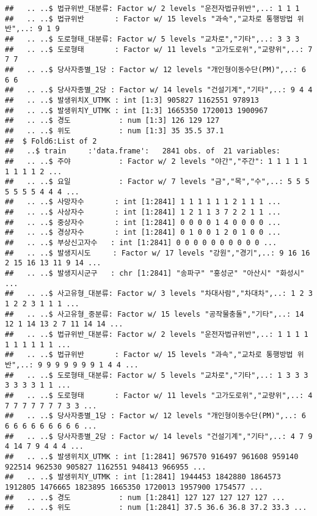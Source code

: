 \documentclass[]{article}
\begin{document}
\begin{verbatim}
##   .. ..$ 법규위반_대분류: Factor w/ 2 levels "운전자법규위반",..: 1 1 1
##   .. ..$ 법규위반       : Factor w/ 15 levels "과속","교차로 통행방법 위반",..: 9 1 9
##   .. ..$ 도로형태_대분류: Factor w/ 5 levels "교차로","기타",..: 3 3 3
##   .. ..$ 도로형태       : Factor w/ 11 levels "고가도로위","교량위",..: 7 7 7
##   .. ..$ 당사자종별_1당 : Factor w/ 12 levels "개인형이동수단(PM)",..: 6 6 6
##   .. ..$ 당사자종별_2당 : Factor w/ 14 levels "건설기계","기타",..: 9 4 4
##   .. ..$ 발생위치X_UTMK : int [1:3] 905827 1162551 978913
##   .. ..$ 발생위치Y_UTMK : int [1:3] 1665350 1720013 1900967
##   .. ..$ 경도           : num [1:3] 126 129 127
##   .. ..$ 위도           : num [1:3] 35 35.5 37.1
##  $ Fold6:List of 2
##   ..$ train     :'data.frame':   2841 obs. of  21 variables:
##   .. ..$ 주야           : Factor w/ 2 levels "야간","주간": 1 1 1 1 1 1 1 1 1 2 ...
##   .. ..$ 요일           : Factor w/ 7 levels "금","목","수",..: 5 5 5 5 5 5 5 4 4 4 ...
##   .. ..$ 사망자수       : int [1:2841] 1 1 1 1 1 1 2 1 1 1 ...
##   .. ..$ 사상자수       : int [1:2841] 1 2 1 1 3 7 2 2 1 1 ...
##   .. ..$ 중상자수       : int [1:2841] 0 0 0 0 1 4 0 0 0 0 ...
##   .. ..$ 경상자수       : int [1:2841] 0 1 0 0 1 2 0 1 0 0 ...
##   .. ..$ 부상신고자수   : int [1:2841] 0 0 0 0 0 0 0 0 0 0 ...
##   .. ..$ 발생지시도     : Factor w/ 17 levels "강원","경기",..: 9 16 16 2 15 16 13 11 9 14 ...
##   .. ..$ 발생지시군구   : chr [1:2841] "송파구" "홍성군" "아산시" "화성시" ...
##   .. ..$ 사고유형_대분류: Factor w/ 3 levels "차대사람","차대차",..: 1 2 3 1 2 2 3 1 1 1 ...
##   .. ..$ 사고유형_중분류: Factor w/ 15 levels "공작물충돌","기타",..: 14 12 1 14 13 2 7 11 14 14 ...
##   .. ..$ 법규위반_대분류: Factor w/ 2 levels "운전자법규위반",..: 1 1 1 1 1 1 1 1 1 1 ...
##   .. ..$ 법규위반       : Factor w/ 15 levels "과속","교차로 통행방법 위반",..: 9 9 9 9 9 9 9 1 4 4 ...
##   .. ..$ 도로형태_대분류: Factor w/ 5 levels "교차로","기타",..: 1 3 3 3 3 3 3 3 1 1 ...
##   .. ..$ 도로형태       : Factor w/ 11 levels "고가도로위","교량위",..: 4 7 7 7 7 7 7 7 3 3 ...
##   .. ..$ 당사자종별_1당 : Factor w/ 12 levels "개인형이동수단(PM)",..: 6 6 6 6 6 6 6 6 6 6 ...
##   .. ..$ 당사자종별_2당 : Factor w/ 14 levels "건설기계","기타",..: 4 7 9 4 14 7 9 4 4 4 ...
##   .. ..$ 발생위치X_UTMK : int [1:2841] 967570 916497 961608 959140 922514 962530 905827 1162551 948413 966955 ...
##   .. ..$ 발생위치Y_UTMK : int [1:2841] 1944453 1842880 1864573 1912805 1476665 1823895 1665350 1720013 1957900 1754577 ...
##   .. ..$ 경도           : num [1:2841] 127 127 127 127 127 ...
##   .. ..$ 위도           : num [1:2841] 37.5 36.6 36.8 37.2 33.3 ...

\end{verbatim}
\end{document}
